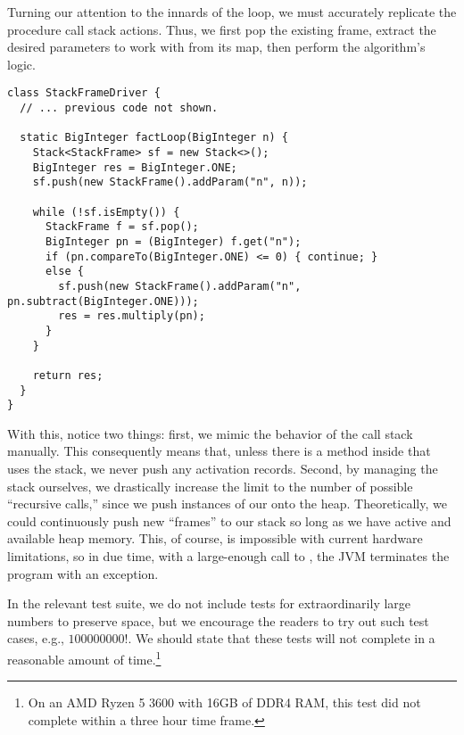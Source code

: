 Turning our attention to the innards of the loop, we must accurately replicate the procedure call stack actions. Thus, we first pop the existing frame, extract the desired parameters to work with from its map, then perform the algorithm's logic.

\begin{lstlisting}[language=MyJava]
class StackFrameDriver {
  // ... previous code not shown.

  static BigInteger factLoop(BigInteger n) {
    Stack<StackFrame> sf = new Stack<>();
    BigInteger res = BigInteger.ONE;
    sf.push(new StackFrame().addParam("n", n));

    while (!sf.isEmpty()) {
      StackFrame f = sf.pop();
      BigInteger pn = (BigInteger) f.get("n");
      if (pn.compareTo(BigInteger.ONE) <= 0) { continue; }
      else {
        sf.push(new StackFrame().addParam("n", pn.subtract(BigInteger.ONE)));
        res = res.multiply(pn);
      }
    }

    return res;
  }
}
\end{lstlisting}

With this, notice two things: first, we mimic the behavior of the call stack manually. This consequently means that, unless there is a method inside that uses the stack, we never push any activation records. Second, by managing the stack ourselves, we drastically increase the limit to the number of possible ``recursive calls,'' since we push instances of our  onto the heap. Theoretically, we could continuously push new ``frames'' to our stack so long as we have active and available heap memory. This, of course, is impossible with current hardware limitations, so in due time, with a large-enough call to , the JVM terminates the program with an  exception. 

In the relevant test suite, we do not include tests for extraordinarily large numbers to preserve space, but we encourage the readers to try out such test cases, e.g., $100000000!$. We should state that these tests will not complete in a reasonable amount of time.\footnote{On an AMD Ryzen 5 3600 with 16GB of DDR4 RAM, this test did not complete within a three hour time frame.} 